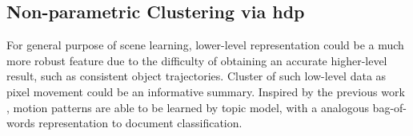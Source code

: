 

\subsection{Non-parametric Clustering via \gls{hdp}}
\label{subsec:hdp-bag-of-words}
For general purpose of scene learning, lower-level representation could be a much more robust feature due to the difficulty of obtaining an accurate higher-level result, such as consistent object trajectories. Cluster of such low-level data as pixel movement could be an informative summary.
Inspired by the previous work \cite{wang2009unsupervised,kuettel2010s}, motion patterns are able to be learned by topic model, with a analogous bag-of-words representation to document classification.

